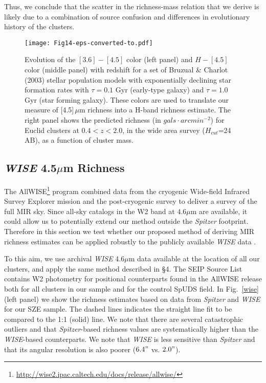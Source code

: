 \documentclass[apj,twocolumn]{emulateapj}
\begin{document}
{Thus, we conclude that the scatter in the richness-mass relation that we derive is likely due to a combination of source confusion and differences in evolutionary history of the clusters.

\begin{figure*}[t!]
\texttt{[image: Fig14-eps-converted-to.pdf]}
\caption{Evolution of the $[3.6]-[4.5]$ color (left panel) and  $H-[4.5 ]$ color (middle panel) with redshift for a set of Bruzual \& Charlot (2003)  stellar population models with exponentially declining star formation rates with $\tau=0.1$ Gyr  (early-type galaxy) and $\tau=1.0$ Gyr (star forming galaxy). These colors are used to translate our measure of [4.5]\,$\mu$m richness into a H-band richness estimate. The right panel shows the predicted richness (in $gals \cdot arcmin^{-2}$) for Euclid clusters at $0.4<z<2.0$, in the wide area survey ($H_{cut}$=24 AB), as a function of cluster mass.}
\label{models}
\end{figure*}


\subsection{{\it WISE} 4.5$\mu$m Richness}

The AllWISE\footnote{\url{http://wise2.ipac.caltech.edu/docs/release/allwise/}} program combined data from the cryogenic Wide-field Infrared Survey Explorer mission \citep[{\it WISE},][]{Wright10}  and the \citep[NEOWISE][]{Mainzer11} post-cryogenic survey to deliver a survey of the full MIR sky.  Since all-sky catalogs in the W2 band at $4.6 \mu$m are available, it 
could allow us to potentially extend our method outside the {\it Spitzer} footprint. Therefore in this section we test whether our proposed method of deriving MIR richness estimates can be applied robustly to the publicly available {\it WISE} data .

To this aim, we use archival {\it WISE} 4.6$\mu$m data available at the location of all our clusters, and apply the same method described in \S 4. The SEIP Source List contains W2 photometry for positional counterparts found in the AllWISE release both for all clusters in our sample and for the control SpUDS field.  In Fig.~\ref{wise} (left panel) we show the richness estimates based on data from  {\it Spitzer} and {\it WISE} for our SZE sample. The dashed lines indicates the straight line fit to be compared to the 1:1 (solid) line. We note that there are several catastrophic outliers and that {\it Spitzer}-based richness values are systematically higher than the {\it WISE}-based counterparts.
We note that {\it WISE} is less sensitive than  {\it Spitzer} and that its angular resolution is also poorer ($6.4"$ vs. $2.0"$).

}
\end{document}
